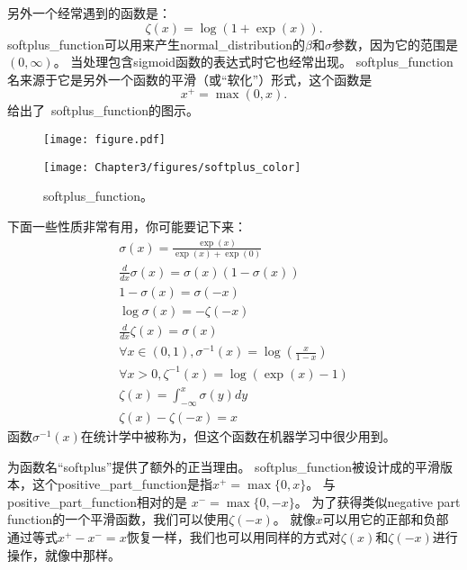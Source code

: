 另外一个经常遇到的函数是\citep{Dugas01}：
\begin{equation}
\zeta(x) = \log(1+\exp(x)).
\end{equation}
\gls{softplus_function}可以用来产生\gls{normal_distribution}的$\beta$和$\sigma$参数，因为它的范围是$(0,\infty)$。
当处理包含sigmoid函数的表达式时它也经常出现。
\gls{softplus_function}名来源于它是另外一个函数的平滑（或``软化''）形式，这个函数是
\begin{equation}
x^+ = \max(0, x).
\end{equation}
给出了~\gls{softplus_function}的图示。
\begin{figure}[!htb]
\ifOpenSource
\centerline{\texttt{[image: figure.pdf]}}
\else
\centerline{\texttt{[image: Chapter3/figures/softplus\_color]}}
\fi
\caption{\gls{softplus_function}。}
\label{fig:chap3_softplus_color}
\end{figure}



下面一些性质非常有用，你可能要记下来：
\begin{gather}
\sigma(x) = \frac{\exp(x)}{\exp(x)+\exp(0)}\\
\frac{d}{dx} \sigma(x) = \sigma(x)(1 - \sigma(x))\\
1-\sigma(x) = \sigma(-x)\\
\log \sigma(x) = -\zeta(-x)\\
\frac{d}{dx} \zeta(x) = \sigma(x)\\
\forall x \in (0, 1), \sigma^{-1}(x) = \log \left (  \frac{x}{1-x} \right)\\
\forall x>0, \zeta^{-1}(x) = \log(\exp(x) - 1)\\
\zeta(x) = \int_{-\infty}^x \sigma(y) dy\\
\zeta(x) - \zeta(-x) = x
\label{eq:3.41}
\end{gather}
函数$\sigma^{-1}(x)$在统计学中被称为，但这个函数在机器学习中很少用到。


为函数名``softplus''提供了额外的正当理由。
\gls{softplus_function}被设计成的平滑版本，这个\gls{positive_part_function}是指$x^+ = \max \{ 0, x\}$。
与\gls{positive_part_function}相对的是 $x^- = \max\{ 0, -x\}$。
为了获得类似\gls{negative part function}的一个平滑函数，我们可以使用$\zeta(-x)$。
就像$x$可以用它的正部和负部通过等式$x^+ - x^- = x$恢复一样，我们也可以用同样的方式对$\zeta(x)$和$\zeta(-x)$进行操作，就像中那样。

